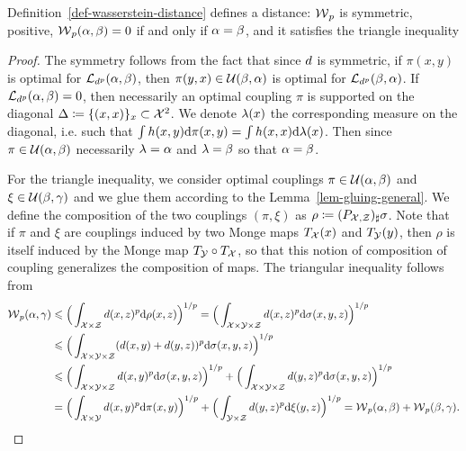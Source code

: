 \begin{prop}\label{prop-metric-measure}
	Definition~\ref{def-wasserstein-distance} defines a distance: $\operatorname{\mathcal{W}}_p$ is symmetric, positive, $\operatorname{\mathcal{W}}_p(\alpha,\beta)=0$ if and only if $\alpha = \beta$, and it satisfies the triangle inequality
\end{prop}

\begin{proof}
	The symmetry follows from the fact that since $d$ is symmetric, if $\pi(x,y)$ is optimal for $\mathcal{L}_{d^p}(\alpha,\beta)$, then
	$\pi(y,x) \in \mathcal{U}(\beta,\alpha)$ is optimal for $\mathcal{L}_{d^p}(\beta,\alpha)$.
	If $\mathcal{L}_{d^p}(\alpha,\beta)=0$, then necessarily an optimal coupling $\pi$ is supported on the diagonal $\Delta \coloneqq \{(x,x)\}_x \subset \mathcal{X}^2$.
	We denote $\lambda(x)$ the corresponding measure on the diagonal, i.e. such that $\int h(x,y) \mathrm{d}\pi(x,y) = \int h(x,x) \mathrm{d} \lambda(x)$.
	Then since $\pi \in \mathcal{U}(\alpha,\beta)$ necessarily $\lambda=\alpha$ and $\lambda=\beta$ so that $\alpha=\beta$.

	For the triangle inequality, we consider optimal couplings $\pi \in \mathcal{U}(\alpha,\beta)$ and $\xi \in \mathcal{U}(\beta,\gamma)$
	and we glue them according to the Lemma~\ref{lem-gluing-general}.
		We define the composition of the two couplings $(\pi,\xi)$ as $\rho \coloneqq (P_{\mathcal{X},\mathcal{Z}})_\sharp \sigma$.
	Note that if $\pi$ and $\xi$ are couplings induced by two Monge maps $T_{\mathcal{X}}(x)$ and $T_{\mathcal{Y}}(y)$, then $\rho$ is itself induced by the Monge map $T_{\mathcal{Y}} \circ T_{\mathcal{X}}$, so that this notion of composition of coupling generalizes the composition of maps.
	The triangular inequality follows from
	$$\begin{aligned}
		\operatorname{\mathcal{W}}_p(\alpha,\gamma) & \leqslant \Big( \int_{\mathcal{X} \times \mathcal{Z}} d(x,z)^p \mathrm{d}\rho(x,z)\Big)^{1/p}
		= \Big( \int_{\mathcal{X} \times \mathcal{Y} \times \mathcal{Z}} d(x,z)^p \mathrm{d}\sigma(x,y,z)\Big)^{1/p}		\\
		 &\leqslant \Big( \int_{\mathcal{X} \times \mathcal{Y} \times \mathcal{Z}} (d(x,y)+d(y,z))^p \mathrm{d}\sigma(x,y,z)\Big)^{1/p} \\
		 &\leqslant \Big( \int_{\mathcal{X} \times \mathcal{Y} \times \mathcal{Z}} d(x,y)^p \mathrm{d}\sigma(x,y,z)\Big)^{1/p}
		    +  \Big( \int_{\mathcal{X} \times \mathcal{Y} \times \mathcal{Z}} d(y,z)^p \mathrm{d}\sigma(x,y,z)\Big)^{1/p} \\
	  &= \Big( \int_{\mathcal{X} \times \mathcal{Y}} d(x,y)^p \mathrm{d}\pi(x,y)\Big)^{1/p}
		    +  \Big( \int_{\mathcal{Y} \times \mathcal{Z}} d(y,z)^p \mathrm{d}\xi(y,z)\Big)^{1/p}
		    = \operatorname{\mathcal{W}}_p(\alpha,\beta)  + \operatorname{\mathcal{W}}_p(\beta,\gamma) .
	\end{aligned}$$
\end{proof}

